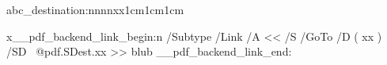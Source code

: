 \documentclass{article}
\begin{document}
\ExplSyntaxOn
abc\pdf_destination:nnnn{xx}{1cm}{1cm}{1cm}

\par x\__pdf_backend_link_begin:n
    { /Subtype /Link /A << /S /GoTo /D ( xx ) /SD~ @pdf.SDest.xx >> }
 blub
 \__pdf_backend_link_end:
\ExplSyntaxOff
\end{document}
